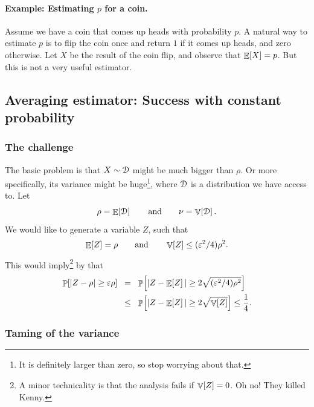 \paragraph*{Example: Estimating $p$ for a coin.}
Assume we have a coin that comes up heads with probability $p$. A natural
way to estimate $p$ is to flip the coin once and return $1$ if it comes
up heads, and zero otherwise.  Let $X$ be the result of the coin flip,
and observe that $\mathop{\mathbb{E}}\!\left[ {X} \right] = p$. But this is not a very useful estimator.



\subsection{Averaging estimator: Success with constant probability}

\subsubsection{The challenge}

The basic problem is that $X \sim \EuScript{D}$ might be much bigger than
$\rho$. Or more specifically, its variance might be huge\footnote{It is
   definitely larger than zero, so stop worrying about that.}, where
$\EuScript{D}$ is a distribution we have access to. Let
\begin{equation*}
    \rho = \mathop{\mathbb{E}}\!\left[ {\EuScript{D}} \right]\qquad\text{and}\qquad
    \nu = \mathop{\mathbb{V}}\!\left[ {\EuScript{D}} \right].
\end{equation*}
 We would like to generate a variable $Z$, such that
\begin{equation}
    \Ex{Z} = \rho%
    \qquad\text{and}\qquad
    \Var{Z} \leq (\eps^2/4) \rho^2.
    \eqlab{small:variance}
\end{equation}
This would imply\footnote{A minor technicality is that the analysis fails
   if $\mathop{\mathbb{V}}\!\left[ {Z} \right]=0$. Oh no! They killed Kenny.} by  that
\begin{align*}
    \Prob{ |Z - \rho| \geq \eps \rho}%
    &\EQ%
    \Prob{ |Z - \Ex{Z}| \geq 2\sqrt{(\eps^2/4) \rho^2}}
    \\&
    \LEQ%
    \Prob{ |Z - \Ex{Z}| \geq 2 \sqrt{\Var{Z}}}%
    \leq \frac{1}{4}.
\end{align*}


\subsubsection{Taming of the variance}

